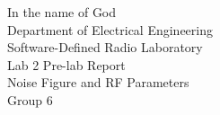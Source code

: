 \begin{titlepage}
    \Huge
    \begin{center}
        In the name of God
        \LARGE
        \\
        \vspace{2cm}
        Department of Electrical Engineering
        \\
        \vspace{2cm}
        Software-Defined Radio Laboratory
        \\
        Lab 2 Pre-lab Report
        \\
        \vspace{4cm}
        Noise Figure and RF Parameters
        \\
        \vspace{1cm}
        Group 6
    \end{center}
\end{titlepage}
\newpage
